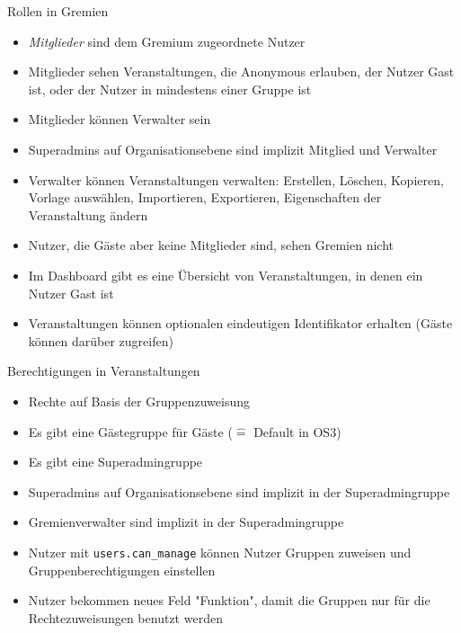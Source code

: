 \documentclass[10pt]{beamer}
\begin{document}
\begin{frame}{Rollen in Gremien}
	\begin{itemize}
		\item \textit{Mitglieder} sind dem Gremium zugeordnete Nutzer
		\item Mitglieder sehen Veranstaltungen, die Anonymous erlauben, der Nutzer Gast ist, oder der Nutzer in mindestens einer Gruppe ist
		\item Mitglieder können Verwalter sein
		\item Superadmins auf Organisationsebene sind implizit Mitglied und Verwalter
		\item Verwalter können Veranstaltungen verwalten: Erstellen, Löschen, Kopieren, Vorlage auswählen, Importieren, Exportieren, Eigenschaften der Veranstaltung ändern
		\item<2-> Nutzer, die Gäste aber keine Mitglieder sind, sehen Gremien nicht
		\item<2-> Im Dashboard gibt es eine Übersicht von Veranstaltungen, in denen ein Nutzer Gast ist
		\item<3-> Veranstaltungen können optionalen eindeutigen Identifikator erhalten (Gäste können darüber zugreifen)
	\end{itemize}
\end{frame}
\begin{frame}{Berechtigungen in Veranstaltungen}
	\begin{itemize}
		\item Rechte auf Basis der Gruppenzuweisung
		\item Es gibt eine Gästegruppe für Gäste ($\hat{=}$ Default in OS3)
		\item Es gibt eine Superadmingruppe
		\item Superadmins auf Organisationsebene sind implizit in der Superadmingruppe
		\item Gremienverwalter sind implizit in der Superadmingruppe
		\item Nutzer mit \texttt{users.can\_manage} können Nutzer Gruppen zuweisen und Gruppenberechtigungen einstellen
		\item Nutzer bekommen neues Feld "Funktion", damit die Gruppen nur für die Rechtezuweisungen benutzt werden
	\end{itemize}
\end{frame}
\end{document}
